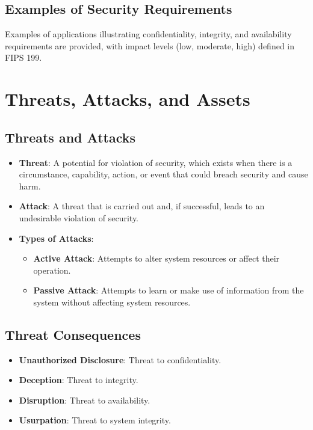 \documentclass{article}
\begin{document}
\subsection{Examples of Security Requirements}
Examples of applications illustrating confidentiality, integrity, and availability requirements are provided, with impact levels (low, moderate, high) defined in FIPS 199.

\section{Threats, Attacks, and Assets}
\subsection{Threats and Attacks}
\begin{itemize}
    \item \textbf{Threat}: A potential for violation of security, which exists when there is a circumstance, capability, action, or event that could breach security and cause harm.
    \item \textbf{Attack}: A threat that is carried out and, if successful, leads to an undesirable violation of security.
    \item \textbf{Types of Attacks}:
        \begin{itemize}
            \item \textbf{Active Attack}: Attempts to alter system resources or affect their operation.
            \item \textbf{Passive Attack}: Attempts to learn or make use of information from the system without affecting system resources.
        \end{itemize}
\end{itemize}

\subsection{Threat Consequences}
\begin{itemize}
    \item \textbf{Unauthorized Disclosure}: Threat to confidentiality.
    \item \textbf{Deception}: Threat to integrity.
    \item \textbf{Disruption}: Threat to availability.
    \item \textbf{Usurpation}: Threat to system integrity.
\end{itemize}
\end{document}
